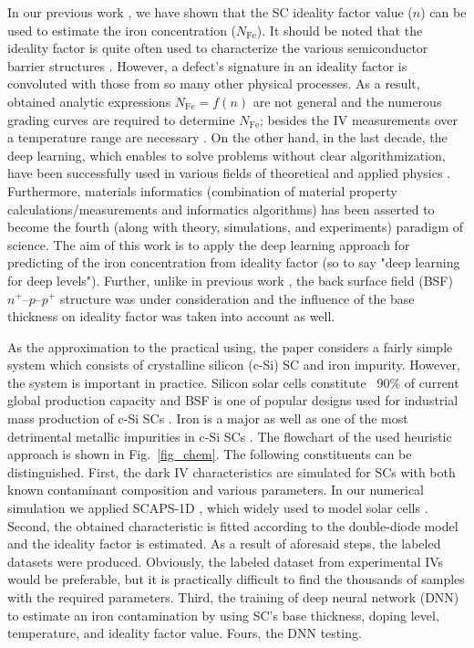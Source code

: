 \documentclass[a4paper,fleqn]{cas-sc}
\begin{document}
In our previous work \citep{Olikh2019SM}, we have shown that the SC ideality factor value ($n$) can be used to estimate the iron concentration ($N_{\mathrm{Fe}}$).
It should be noted that the ideality factor is quite often  used to characterize the various
semiconductor barrier structures \cite{Heide,Duan,n_CharGaN,n_CharSemic,n_CharPhysRevAppl}.
However, a defect's signature in an ideality factor is convoluted with those from so many other physical processes.
As a result, obtained analytic expressions $N_{\mathrm{Fe}}=f(n)$ are not general and the numerous grading curves are required to determine $N_{\mathrm{Fe}}$;
besides the IV measurements over a temperature range are necessary \citep{Olikh2019SM}.
On the other hand, in the last decade, the deep learning, which enables to solve problems without clear algorithmization, have been successfully used in various fields of theoretical and applied physics \cite{MachLean_RevModPhys,MachLeanJAP,MachLeanPPV}.
Furthermore, materials informatics
(combination of material property calculations/measurements and informatics algorithms)
has been asserted \cite{MI_JAP} to become the fourth (along with theory, simulations, and experiments) paradigm of science.
The aim of this work is to apply the deep learning approach for predicting of the iron concentration from ideality factor
(so to say "deep learning for deep levels").
Further, unlike in previous work \citep{Olikh2019SM}, the back surface field (BSF) $n^+$--$p$--$p^+$ structure was under consideration
and the influence of the base thickness on ideality factor was taken into account as well.

As the approximation to the practical using, the paper considers a fairly simple system
which consists of crystalline silicon (c-Si) SC  and iron impurity.
However, the system is important in practice.
Silicon solar cells constitute ~90\% of current global production capacity \citep{SCRev2015} and
BSF  is one of  popular designs used for industrial mass production of c-Si SCs \citep{SCRev2020}.
Iron is a major as well as one of the most detrimental metallic impurities in c-Si SCs \citep{ZHU2016192,FeB:Schmidt,IronSC}.
The flowchart of the used heuristic approach is shown in Fig.~\ref{fig_chem}.
The following constituents can be distinguished.
First, the dark IV characteristics are simulated for SCs with both known contaminant composition and various parameters.
In our numerical simulation we applied SCAPS-1D \citep{SCAPS1,SCAPS2},
which widely used to model solar cells \citep{SCAPSuseSi4,SCAPSuseSi1,SCAPSuseSi6,SCAPSuse1,SCAPSuse2020,SCAPSuse2017SM}.
Second, the obtained characteristic is fitted according to the double-diode model and the ideality factor is estimated.
As a result of aforesaid steps, the labeled datasets were produced.
Obviously, the labeled dataset from experimental IVs  would be preferable,
but it is practically difficult to find the thousands of samples with the required parameters.
Third, the training of deep neural network (DNN) to estimate an iron contamination  by using SC's base thickness, doping level,
temperature, and ideality factor value.
Fours, the DNN testing.
\end{document}
